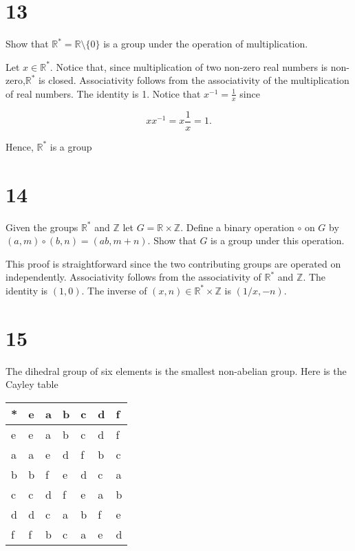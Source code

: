 \documentclass[a4paper]{article}
\begin{document}
\section*{13}

Show that $\mathbb{R}^{*} = \mathbb{R} \setminus \{ 0 \}$ is a group under the operation of multiplication.

\vspace{\baselineskip}

Let $x \in \mathbb{R}^{*}$. Notice that, since multiplication of two non-zero real numbers is non-zero,$\mathbb{R}^{*}$ is closed. Associativity follows from the associativity of the multiplication of real numbers. The identity is 1. Notice that $x^{-1} = \frac{1}{x}$ since

$$xx^{-1} = x \frac{1}{x} = 1.$$

Hence, $\mathbb{R}^*$ is a group


\section*{14}

Given the groups $\mathbb{R}^*$ and $\mathbb{Z}$ let $G = \mathbb{R} \times \mathbb{Z}$. Define a binary operation $\circ$ on $G$ by $(a,m) \circ (b,n) = (ab, m+n)$. Show that $G$ is a group under this operation.

\vspace{\baselineskip}

This proof is straightforward since the two contributing groups are operated on independently. Associativity follows from the associativity of $\mathbb{R}^*$ and $\mathbb{Z}$. The identity is $(1,0)$. The inverse of $(x, n) \in \mathbb{R}^* \times \mathbb{Z}$ is $(1/x, -n)$.

\section*{15}

The dihedral group of six elements is the smallest non-abelian group. Here is the Cayley table

\begin{tabular}{ l | l l l l l l }
  * & e & a & b & c & d & f \\
  \hline      
  e & e & a & b & c & d & f \\
  a & a & e & d & f & b & c \\
  b & b & f & e & d & c & a \\
  c & c & d & f & e & a & b \\
  d & d & c & a & b & f & e \\
  f & f & b & c & a & e & d
\end{tabular}
\end{document}

